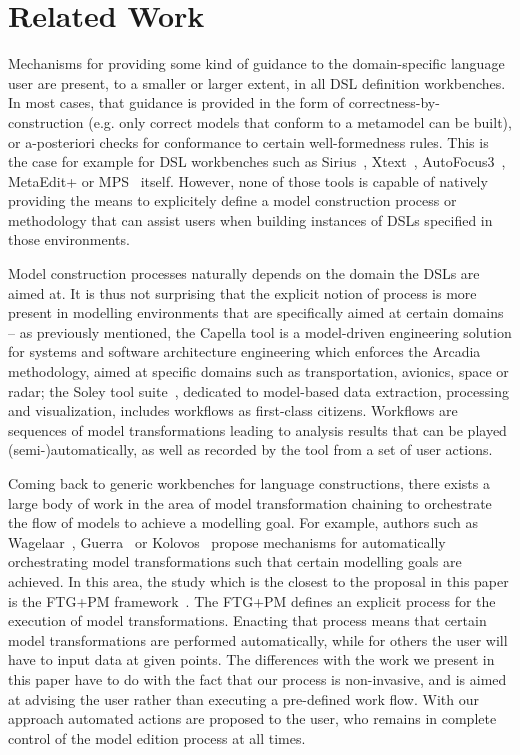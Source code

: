 \section{Related Work}
\label{sec:related_work}

Mechanisms for providing some kind of guidance to the domain-specific
language user are present, to a smaller or larger extent, in all DSL definition
workbenches. In most cases, that guidance is provided in the form of
correctness-by-construction (e.g. only correct models that conform to a
metamodel can be built), or a-posteriori checks for conformance to certain
well-formedness rules. This is the case for example for DSL workbenches such as
Sirius~\cite{DBLP:conf/asplos/HauswaldLZLRKDM15},
Xtext~\cite{DBLP:conf/oopsla/EysholdtB10}, AutoFocus3~\cite{AF315},
MetaEdit+\cite{DBLP:conf/sle/Tolvanen16} or MPS~\cite{DBLP:conf/pppj/PechSV13}
itself. However, none of those tools is capable of natively providing the means
to explicitely define a model construction process or methodology that can
assist users when building instances of DSLs specified in those environments.

Model construction processes naturally depends on the domain the DSLs are aimed
at. It is thus not surprising that the explicit notion of process is more
present in modelling environments that are specifically aimed at certain domains
-- as previously mentioned, the Capella tool is a model-driven engineering
solution for systems and software architecture engineering which enforces the
Arcadia~\cite{DBLP:conf/syscon/BonnetVEN16} methodology, aimed at specific
domains such as transportation, avionics, space or radar; the Soley tool
suite~\cite{soley}, dedicated to model-based data extraction, processing and
visualization, includes workflows as first-class citizens.
Workflows are sequences of model transformations leading to analysis results
that can be played (semi-)automatically, as well as recorded by the tool from a
set of user actions.

Coming back to generic workbenches for language constructions, there exists a
large body of work in the area of model transformation chaining to orchestrate
the flow of models to achieve a modelling goal. For example, authors such as
Wagelaar~\cite{wagelaar2006blackbox}, Guerra~\cite{transml} or
Kolovos~\cite{Kolovos2008} propose mechanisms for automatically orchestrating
model transformations such that certain modelling goals are achieved. In this
area, the study which is the closest to the proposal in this paper is the FTG+PM
framework~\cite{DBLP:conf/sdl/LucioMDVJ13,MustafizDLV12}. The FTG+PM defines an
explicit process for the execution of model transformations.
Enacting that process means that certain model transformations are performed
automatically, while for others the user will have to input data at given
points. The differences with the work we present in this paper have to do with
the fact that our process is non-invasive, and is aimed at advising the user
rather than executing a pre-defined work flow. With our approach automated
actions are proposed to the user, who remains in complete control of the model
edition process at all times.

